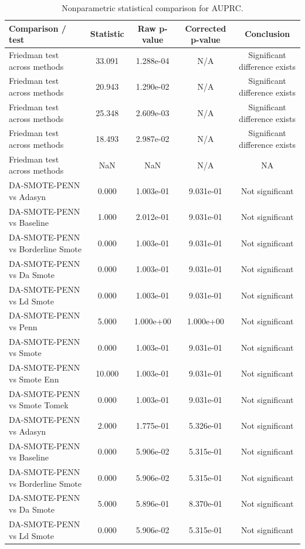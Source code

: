 \begin{table}[htb]
\centering
\caption{Nonparametric statistical comparison for AUPRC.}
\label{tab:stats}
\small
\begin{tabular}{lcccc}
\toprule
Comparison / test & Statistic & Raw p-value & Corrected p-value & Conclusion
\\
\midrule
Friedman test across methods & 33.091 & 1.288e-04 & N/A & Significant difference exists
\\
Friedman test across methods & 20.943 & 1.290e-02 & N/A & Significant difference exists
\\
Friedman test across methods & 25.348 & 2.609e-03 & N/A & Significant difference exists
\\
Friedman test across methods & 18.493 & 2.987e-02 & N/A & Significant difference exists
\\
Friedman test across methods & NaN & NaN & N/A & NA
\\
DA-SMOTE-PENN vs Adasyn & 0.000 & 1.003e-01 & 9.031e-01 & Not significant
\\
DA-SMOTE-PENN vs Baseline & 1.000 & 2.012e-01 & 9.031e-01 & Not significant
\\
DA-SMOTE-PENN vs Borderline Smote & 0.000 & 1.003e-01 & 9.031e-01 & Not significant
\\
DA-SMOTE-PENN vs Da Smote & 0.000 & 1.003e-01 & 9.031e-01 & Not significant
\\
DA-SMOTE-PENN vs Ld Smote & 0.000 & 1.003e-01 & 9.031e-01 & Not significant
\\
DA-SMOTE-PENN vs Penn & 5.000 & 1.000e+00 & 1.000e+00 & Not significant
\\
DA-SMOTE-PENN vs Smote & 0.000 & 1.003e-01 & 9.031e-01 & Not significant
\\
DA-SMOTE-PENN vs Smote Enn & 10.000 & 1.003e-01 & 9.031e-01 & Not significant
\\
DA-SMOTE-PENN vs Smote Tomek & 0.000 & 1.003e-01 & 9.031e-01 & Not significant
\\
DA-SMOTE-PENN vs Adasyn & 2.000 & 1.775e-01 & 5.326e-01 & Not significant
\\
DA-SMOTE-PENN vs Baseline & 0.000 & 5.906e-02 & 5.315e-01 & Not significant
\\
DA-SMOTE-PENN vs Borderline Smote & 0.000 & 5.906e-02 & 5.315e-01 & Not significant
\\
DA-SMOTE-PENN vs Da Smote & 5.000 & 5.896e-01 & 8.370e-01 & Not significant
\\
DA-SMOTE-PENN vs Ld Smote & 0.000 & 5.906e-02 & 5.315e-01 & Not significant

\end{tabular}
\end{table}
